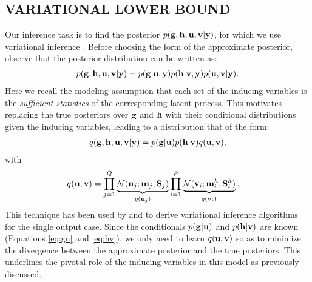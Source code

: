 \subsection{VARIATIONAL LOWER BOUND \label{sec:variationalLowerBound}}
\newcommand{\ug}{\u_g}
\newcommand{\uh}{\u^h}
\newcommand{\mgj}{\m_j}
\newcommand{\mhi}{\m^h_i}
\newcommand{\Sgj}{\S_j}
\newcommand{\Shi}{\S^h_i}
Our inference task is to find the posterior $p(\mathbf{g}, \mathbf{h}, \mathbf{u}, \mathbf{v} | \mathbf{y})$, for which we use variational inference \citep{jordan-variational-99}. 
Before choosing the form of the approximate posterior, observe that the posterior distribution can be written as:
\begin{align}
p(\mathbf{g}, \mathbf{h}, \mathbf{u}, \mathbf{v} | \mathbf{y}) = p(\mathbf{g} | \mathbf{u}, \mathbf{y}) p(\mathbf{h} | \mathbf{v}, \mathbf{y}) p(\mathbf{u}, \mathbf{v} | \mathbf{y}).
\end{align}
Here we recall the modeling assumption that each set of the inducing variables is the \emph{sufficient statistics} of the corresponding latent process. 
This motivates replacing the true posteriors over $\mathbf{g}$ and $\mathbf{h}$ with their conditional distributions given the inducing variables, leading to a distribution that of the form:
\begin{align}
q(\mathbf{g}, \mathbf{h}, \mathbf{u}, \mathbf{v} | \mathbf{y})
= p(\mathbf{g}|\mathbf{u}) p(\mathbf{h}|\mathbf{v}) q(\mathbf{u},\mathbf{v}),
\end{align}
with
\begin{align}
q(\u,\v) &= \prod_{j=1}^Q \underbrace{\Normal(\u_j; \mgj, \Sgj)}_{q(\u_j)} \prod_{i=1}^P  \underbrace{\Normal(\v_i; \mhi, \Shi)}_{q(\v_i)}.
\end{align}
This technique has been used by \citet{titsias2009variational} and \citet{hensmangaussian} 
to derive variational inference algorithms for the single output case.
Since the conditionals $p(\mathbf{g} | \mathbf{u})$ and $p(\mathbf{h} | \mathbf{v})$ are known (Equations \ref{eq:gu} and \ref{eq:hv}), 
we only need to 
learn $q(\mathbf{u}, \mathbf{v})$ so as to minimize the divergence between the approximate posterior and
the true posteriors.
This underlines the pivotal role of the inducing variables in this model as previously discussed.

